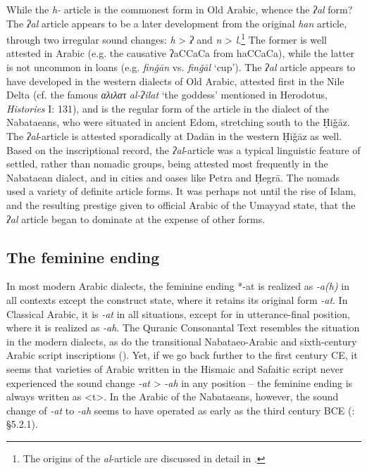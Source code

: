 \documentclass[output=paper]{langsci/langscibook}
\begin{document}
While the \textit{h-} article is the commonest form in Old Arabic, whence the \textit{ʔal} form? The \textit{ʔal} article appears to be a later development from the original \textit{han} article, through two irregular sound changes: \textit{h} > \textit{ʔ} and \textit{n} > \textit{l}.\footnote{The origins of the \textit{al}-article are discussed in detail in \citep{Al-Jalladforthcoming}.} The former is well attested in Arabic (e.g. the causative ʔaCCaCa from haCCaCa), while the latter is not uncommon in loans (e.g. \textit{finǧān} vs. \textit{finǧāl} ‘cup’). The \textit{ʔal} article appears to have developed in the western dialects of Old Arabic, attested first in the Nile Delta (cf. the famous \textit{αλιλατ} \textit{al-ʔilat} ‘the goddess’ mentioned in Herodotus, \textit{Histories} I: 131), and is the regular form of the article in the dialect of the Nabataeans, who were situated in ancient Edom, stretching south to the Ḥiǧāz. The \textit{ʔal}-article is attested sporadically at Dadān in the western Ḥiǧāz as well. Based on the inscriptional record, the \textit{ʔal}-article was a typical linguistic feature of settled, rather than nomadic groups, being attested most frequently in the Nabataean dialect, and in cities and oases like Petra and Ḥegrā. The nomads used a variety of definite article forms. It was perhaps not until the rise of Islam, and the resulting prestige given to official Arabic of the Umayyad state, that the \textit{ʔal} article began to dominate at the expense of other forms.

\subsection{The feminine ending}
In most modern Arabic dialects, the feminine ending *-at is realized as \textit{-a(h)} in all contexts except the construct state, where it retains its original form \textit{-at}. In Classical Arabic, it is \textit{-at} in all situations, except for in utterance-final position, where it is realized as \textit{-ah}. The Quranic Consonantal Text resembles the situation in the modern dialects, as do the transitional Nabataeo-Arabic and sixth-century Arabic script inscriptions (\citealt{Nehmé2017}). Yet, if we go back further to the first century CE, it seems that varieties of Arabic written in the Hismaic and Safaitic script never experienced the sound change \textit{-at} > \textit{-ah} in any position – the feminine ending is always written as <t>. In the Arabic of the Nabataeans, however, the sound change of \textit{-at} to \textit{-ah} seems to have operated as early as the third century BCE (\citealt{Al-Jallad2017early}: §5.2.1). 
\end{document}
